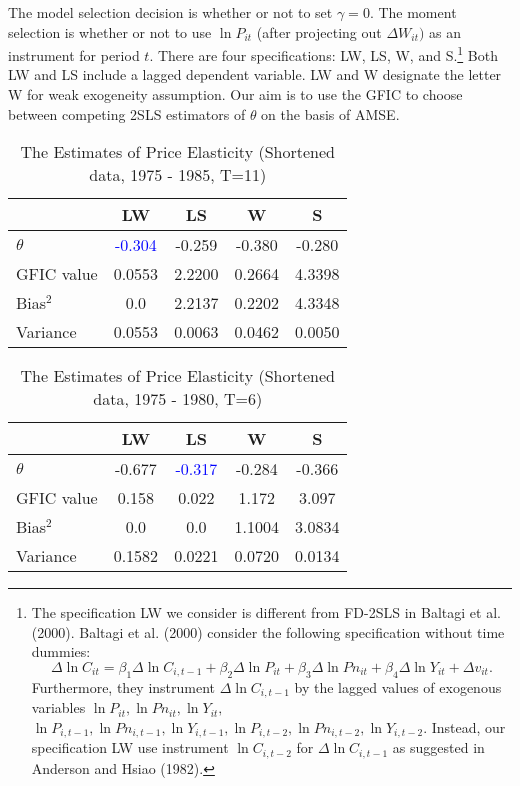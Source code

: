 The model selection decision is whether or not to set $\gamma = 0$. The moment selection is whether or not to use $\ln P_{it}$ (after projecting out $\Delta W_{it})$ as an instrument for period $t$.  There are four specifications:  LW, LS, W, and S.\footnote{The specification LW we consider is different from FD-2SLS in Baltagi et al. (2000). Baltagi et al. (2000) consider the following specification without time dummies:
 \[
\Delta \ln C_{it} = \beta_1 \Delta \ln C_{i,t-1} +  \beta_2 \Delta \ln P_{it} +\beta_3 \Delta \ln Pn_{it} +  \beta_4 \Delta \ln Y_{it} + \Delta v_{it}.
\]
Furthermore, they instrument $\Delta \ln C_{i,t-1}$ by the lagged values of exogenous variables $\ln P_{it}, \ln Pn_{it}, \ln Y_{it},$ $\ln P_{i,t-1}, \ln Pn_{i,t-1}, \ln Y_{i,t-1}, \ln P_{i,t-2}, \ln Pn_{i,t-2}, \ln Y_{i,t-2}$. Instead, our specification LW use instrument $\ln C_{i, t-2}$ for $\Delta \ln C_{i,t-1}$ as suggested in Anderson and Hsiao (1982).}
 Both LW and LS include a lagged dependent variable. LW and W designate the letter W for weak exogeneity assumption. Our aim is to use the GFIC to choose between competing 2SLS estimators of $\theta$ on the basis of AMSE. %
\newpage


\begin{table}[h!]\centering
 \caption{The Estimates of Price Elasticity (Shortened data, 1975 - 1985, T=11)}
\begin{tabular}{l c c c c }\hline\hline 
 & LW   &      LS   &       W   &      S\\
\hline
$\theta$ & \textcolor{blue}{-0.304} & -0.259 &  -0.380 &  -0.280\\
\hline
GFIC value &0.0553 & 2.2200 & 0.2664 &  4.3398\\
Bias$^2$ & 0.0 & 2.2137 & 0.2202 & 4.3348\\
Variance & 0.0553 & 0.0063 & 0.0462 & 0.0050\\ 
\hline
\hline
\end{tabular}
\end{table}



\begin{table}[h!]\centering
 \caption{The Estimates of Price Elasticity (Shortened data, 1975 - 1980, T=6)}
\begin{tabular}{l c c c c }\hline\hline 
 & LW   &      LS   &       W   &      S\\
\hline
$\theta$ & -0.677 & \textcolor{blue}{ -0.317} &  -0.284 &  -0.366\\
\hline
GFIC value &0.158 & 0.022 & 1.172& 3.097\\
Bias$^2$ & 0.0 & 0.0 & 1.1004 & 3.0834\\
Variance &0.1582 & 0.0221 & 0.0720 & 0.0134\\ 
\hline
\hline
\end{tabular}
\end{table}


